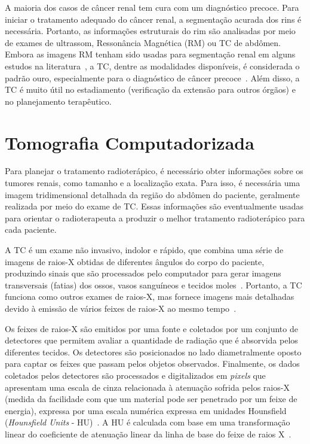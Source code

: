 A maioria dos casos de câncer renal tem cura com um diagnóstico precoce. Para iniciar o tratamento adequado do câncer renal, a segmentação acurada dos rins é necessária. Portanto, as informações estruturais do rim são analisadas por meio de exames de ultrassom, Ressonância Magnética (RM) ou TC de abdômen. Embora as imagens RM tenham sido usadas para segmentação renal em alguns estudos na literatura~\cite{goceri2011automatic,7424483}, a TC, dentre as modalidades disponíveis, é considerada o padrão ouro, especialmente para o diagnóstico de câncer precoce~\cite{kaur2016survey}. Além disso, a TC é muito útil no estadiamento (verificação da extensão para outros órgãos) e no planejamento terapêutico.

\section{Tomografia Computadorizada}
\label{sec:tumografia-computadorizada}

Para planejar o tratamento radioterápico, é necessário obter informações sobre os tumores renais, como tamanho e a localização exata. Para isso, é necessária uma imagem tridimensional detalhada da região do abdômen do paciente, geralmente realizada por meio do exame de TC. Essas informações são eventualmente usadas para orientar o radioterapeuta a produzir o melhor tratamento radioterápico para cada paciente.

A TC é um exame não invasivo, indolor e rápido, que combina uma série de imagens de raios-X obtidas de diferentes ângulos do corpo do paciente, produzindo sinais que são processados pelo computador para gerar imagens transversais (fatias) dos ossos, vasos sanguíneos e tecidos moles~\cite{Buzug2011}. Portanto, a TC funciona como outros exames de raios-X, mas fornece imagens mais detalhadas devido à emissão de vários feixes de raios-X ao mesmo tempo~\cite{gwynne2012image}.

Os feixes de raios-X são emitidos por uma fonte e coletados por um conjunto de detectores que permitem avaliar a quantidade de radiação que é absorvida pelos diferentes tecidos. Os detectores são posicionados no lado diametralmente oposto para captar os feixes que passam pelos objetos observados. Finalmente, os dados coletados pelos detectores são processados e digitalizados em \textit{pixels} que apresentam uma escala de cinza relacionada à atenuação sofrida pelos raios-X (medida da facilidade com que um material pode ser penetrado por um feixe de energia), expressa por uma escala numérica expressa em unidades Hounsfield (\textit{Hounsfield Units} - HU)~\cite{Buzug2011}. A HU é calculada com base em uma transformação linear do coeficiente de atenuação linear da linha de base do feixe de raios X~\cite{ADAMS2012277}.

